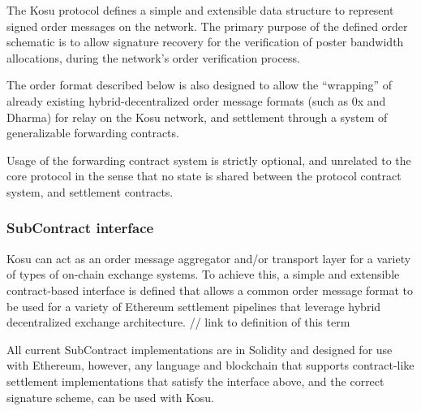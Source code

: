 \documentclass[10pt]{article}
\begin{document}
The Kosu protocol defines a simple and extensible data structure to represent signed order messages on the network. The primary purpose of the defined order schematic is to allow signature recovery for the verification of poster bandwidth allocations, during the network’s order verification process.
\medskip

The order format described below is also designed to allow the “wrapping” of already existing hybrid-decentralized order message formats (such as 0x and Dharma) for relay on the Kosu network, and settlement through a system of generalizable forwarding contracts. 
\medskip 

Usage of the forwarding contract system is strictly optional, and unrelated to the core protocol in the sense that no state is shared between the protocol contract system, and settlement contracts.

\subsubsection{SubContract interface}\label{subcontract-interface}

Kosu can act as an order message aggregator and/or transport layer for a variety of types of on-chain exchange systems. To achieve this, a simple and extensible contract-based interface is defined that allows a common order message format to be used for a variety of Ethereum settlement pipelines that leverage hybrid decentralized exchange architecture. // link to definition of this term
\medskip

All current SubContract implementations are in Solidity and designed for use with Ethereum, however, any language and blockchain that supports contract-like settlement implementations that satisfy the interface above, and the correct signature scheme, can be used with Kosu.
\medskip
\end{document}
